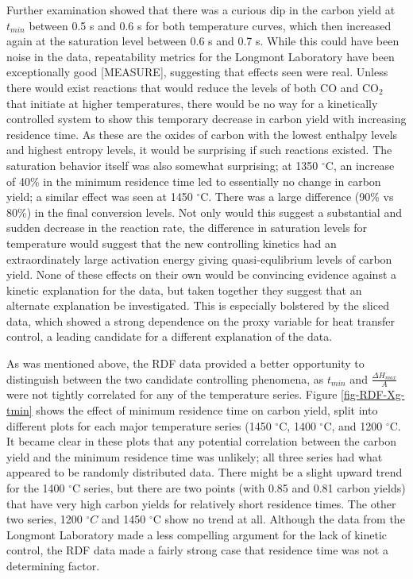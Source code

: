 \documentclass[11pt,twocolumn]{article}
\begin{document}
Further examination showed that there was a curious dip in the carbon yield at $t_{min}$ between 0.5 s and 0.6 s for both temperature curves, which then increased again at the saturation level between 0.6 s and 0.7 s.  While this could have been noise in the data, repeatability metrics for the Longmont Laboratory have been exceptionally good [MEASURE], suggesting that effects seen were real.  Unless there would exist reactions that would reduce the levels of both CO and CO$_{2}$ that initiate at higher temperatures, there would be no way for a kinetically controlled system to show this temporary decrease in carbon yield with increasing residence time.  As these are the oxides of carbon with the lowest enthalpy levels and highest entropy levels, it would be surprising if such reactions existed.  The saturation behavior itself was also somewhat surprising; at 1350 $^{\circ}$C, an increase of 40\% in the minimum residence time led to essentially no change in carbon yield; a similar effect was seen at 1450 $^{\circ}$C.  There was a large difference (90\% vs 80\%) in the final conversion levels.  Not only would this suggest a substantial and sudden decrease in the reaction rate, the difference in saturation levels for temperature would suggest that the new controlling kinetics had an extraordinately large activation energy giving quasi-equlibrium levels of carbon yield.  None of these effects on their own would be convincing evidence against a kinetic explanation for the data, but taken together they suggest that an alternate explanation be investigated.  This is especially bolstered by the sliced data, which showed a strong dependence on the proxy variable for heat transfer control, a leading candidate for a different explanation of the data.

As was mentioned above, the RDF data provided a better opportunity to distinguish between the two candidate controlling phenomena, as $t_{min}$ and $\frac{\Delta H_{max}}{A}$ were not tightly correlated for any of the temperature series.  Figure \ref{fig-RDF-Xg-tmin} shows the effect of minimum residence time on carbon yield, split into different plots for each major temperature series (1450 $^{\circ}$C, 1400 $^{\circ}$C, and 1200 $^{\circ}$C.  It became clear in these plots that any potential correlation between the carbon yield and the minimum residence time was unlikely; all three series had what appeared to be randomly distributed data.  There might be a slight upward trend for the 1400 $^{\circ}$C series, but there are two points (with 0.85 and 0.81 carbon yields) that have very high carbon yields for relatively short residence times.  The other two series, 1200 $^{\circ}C$ and 1450 $^{\circ}$C show no trend at all.  Although the data from the Longmont Laboratory made a less compelling argument for the lack of kinetic control, the RDF data made a fairly strong case that residence time was not a determining factor.
\end{document}
